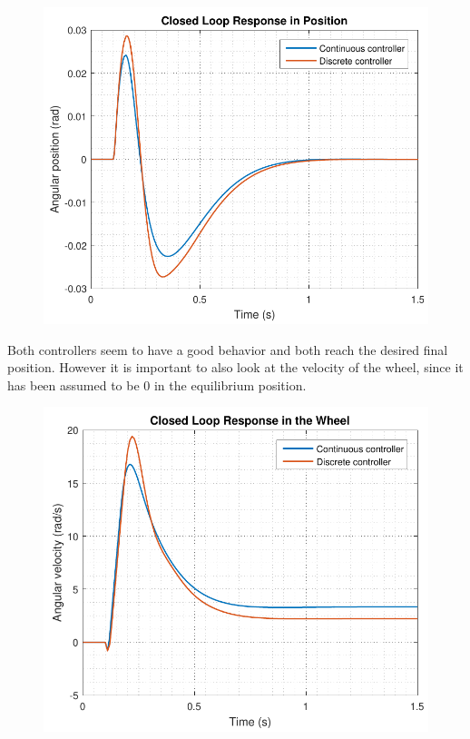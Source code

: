 \hspace{0.03\linewidth}
\begin{minipage}{0.45\linewidth}
    \begin{figure}[H]\vspace{-4mm}
      \includegraphics[scale=.53]{figures/positionComp}
      \captionsetup{justification=centering}
      \label{discreteVsContinuousSimulation}
    \end{figure}\vspace{-5mm}
\end{minipage}

Both controllers seem to have a good behavior and both reach the desired final position. However it is important to also look at the velocity of the wheel, since it has been assumed to be 0 in the equilibrium position.
%
\begin{figure}[H]\vspace{-4mm}
	\centering
	\includegraphics[scale=.53]{figures/wheelComp}
   \label{fig:discreteVsContinuousWheel}
\end{figure}\vspace{-5mm}

